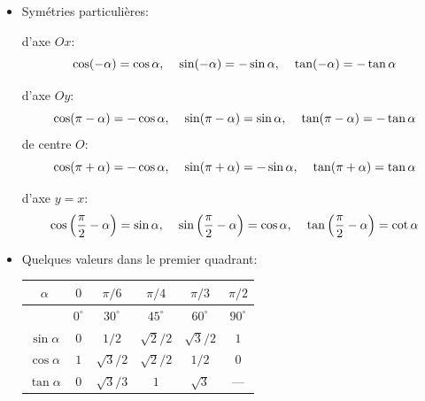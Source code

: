 \documentclass[12pt,a4paper]{article}
\begin{document}
\begin{itemize}[label=$\bullet$]
$$\cos\alpha,\sin\alpha\in[-1,1], \hspace{1cm} \tan\alpha,\cot\alpha\in\mathbb{R}.$$

 $$\cos(\alpha+k\cdot 2\pi)=\cos\alpha, \hspace{1cm}\sin(\alpha+k\cdot 2\pi)=\sin\alpha,$$ pour tout $k\in\mathbb{Z}.$
 
\item \textcolor{th!60!black}{Symétries particulières:}

 d'axe $Ox$: $$\cos(-\alpha)=\cos\alpha, \hspace{0.4cm} \sin(-\alpha)=-\sin\alpha, \hspace{0.4cm}  \tan(-\alpha)=-\tan\alpha$$

 d'axe $Oy$: $$\cos(\pi-\alpha)=-\cos\alpha,\hspace{0.4cm} \sin(\pi-\alpha)=\sin\alpha,\hspace{0.4cm}\tan(\pi-\alpha)=-\tan\alpha$$
 de centre $O$: $$\cos(\pi+\alpha)=-\cos\alpha,\hspace{0.4cm}\sin(\pi+\alpha)=-\sin\alpha,\hspace{0.4cm}\tan(\pi+\alpha)=\tan\alpha$$

 d'axe $y=x$: $$\cos\left(\frac{\pi}{2}-\alpha\right)=\sin\alpha,\hspace{0.4cm}\sin\left(\frac{\pi}{2}-\alpha\right)=\cos\alpha,\hspace{0.4cm}\tan\left(\frac{\pi}{2}-\alpha\right)=\cot\alpha$$
\item \textcolor{th!60!black}{Quelques valeurs dans le premier quadrant:}
\begin{center}
\begin{tabular}{| c || c | c | c | c | c |}
    \hline
   $\alpha$ & $0$ & $\pi/6$ & $\pi/4$ & $\pi/3$ & $\pi/2$ \\ \hline
    & $0^\circ$ & $30^\circ$ & $45^\circ$ & $60^\circ$ & $90^\circ$ \\ \hline\hline
   $\sin\alpha$ & $0$ & $1/2$ & $\sqrt{2}/2$ & $\sqrt{3}/2$ & $1$ \\ \hline
   $\cos\alpha$ & $1$ & $\sqrt{3}/2$ & $\sqrt{2}/2$ & $1/2$ & $0$ \\ \hline
   $\tan\alpha$ & $0$ & $\sqrt{3}/3$ & $1$ & $\sqrt{3}$ & ---\\ \hline
  \end{tabular}
  \end{center}
\end{itemize}
\end{document}
